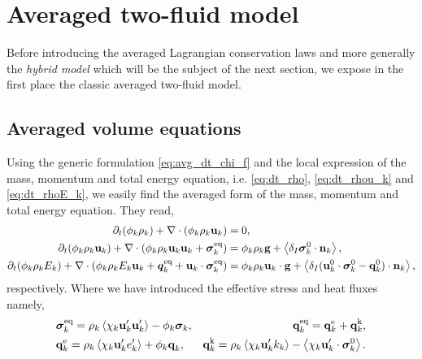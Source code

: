 \section{Averaged two-fluid model}
\label{ap:two-fluid_model}
Before introducing the averaged Lagrangian conservation laws and more generally the \textit{hybrid model} which will be the subject of the next section, we expose in the first place the classic averaged two-fluid model. 

\subsection{Averaged volume equations}
Using the generic formulation \eqref{eq:avg_dt_chi_f} and the local expression of the mass, momentum and total energy equation, i.e. \ref{eq:dt_rho}, \ref{eq:dt_rhou_k} and \ref{eq:dt_rhoE_k}, we easily find the averaged form of the mass, momentum and total energy equation.
They read, 
\begin{align}
    \label{eq:dt_avg_rho_k}
    \pddt (\phi_k \rho_k)  
    + \div (
        \phi_k \rho_k\textbf{u}_k
    )
    &= 
    0,\\
    \label{eq:dt_avg_rhou_k}
    \pddt (\phi_k \rho_k\textbf{u}_k)  
    + \div (
        \phi_k \rho_k\textbf{u}_k\textbf{u}_k
        + \bm{\sigma}_k^\text{eq}
    )
    &= 
    \phi_k \rho_k \textbf{g} 
    +  \avg{\delta_I \bm{\sigma}_k^0 \cdot \textbf{n}_k},\\
    \label{eq:dt_avg_rhoE_k}
    \pddt (\phi_k\rho_kE_k)  
    + \div (
        \phi_k\rho_kE_k\textbf{u}_k
        + \bm{q}_k^\text{eq}
        + \textbf{u}_k \cdot \bm{\sigma}_k^\text{eq}
        )
    &= 
    \phi_k \rho_k\textbf{u}_k \cdot \textbf{g} 
    + \avg{\delta_I (\textbf{u}_k^0 \cdot \bm{\sigma}_k^0 - \textbf{q}_k^0)\cdot \textbf{n}_k},
\end{align} 
respectively. 
Where we have introduced the effective stress and heat fluxes namely, 
\begin{align*}
    &\bm{\sigma}_k^\text{eq}
    = 
     \rho_k\avg{\chi_k \textbf{u}_k'\textbf{u}_k'}
      - \phi_k \bm{\sigma}_k,%
    &\textbf{q}_k^\text{eq}
    =\textbf{q}_k^\text{e} +\textbf{q}_k^\text{k},  \\
    &\textbf{q}_k^\text{e}
    = \rho_k \avg{\chi_k\textbf{u}_k' e_k'} 
    + \phi_k\textbf{q}_k,
    &\textbf{q}_k^\text{k}
    = \rho_k \avg{\chi_k \textbf{u}_k' k_k} 
    - \avg{\chi_k \textbf{u}_k' \cdot \bm{\sigma}_k^0}.
\end{align*}

